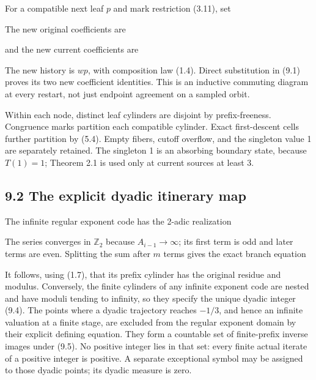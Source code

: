 For a compatible next leaf \(p\) and mark restriction (3.11), set


The new original coefficients are


and the new current coefficients are


The new history is \(wp\), with composition law (1.4). Direct
substitution in (9.1) proves its two new coefficient identities. This is
an inductive commuting diagram at every restart, not just endpoint
agreement on a sampled orbit.

Within each node, distinct leaf cylinders are disjoint by
prefix-freeness. Congruence marks partition each compatible cylinder.
Exact first-descent cells further partition by (5.4). Empty fibers,
cutoff overflow, and the singleton value 1 are separately retained. The
singleton 1 is an absorbing boundary state, because \(T(1)=1\); Theorem
2.1 is used only at current sources at least 3.

\subsection{9.2 The explicit dyadic itinerary map}

The infinite regular exponent code has the 2-adic realization


The series converges in \(\mathbb Z_2\) because \(A_{i-1}\to\infty\);
its first term is odd and later terms are even. Splitting the sum after
\(m\) terms gives the exact branch equation


It follows, using (1.7), that its prefix cylinder has the original
residue and modulus. Conversely, the finite cylinders of any infinite
exponent code are nested and have moduli tending to infinity, so they
specify the unique dyadic integer (9.4). The points where a dyadic
trajectory reaches \(-1/3\), and hence an infinite valuation at a finite
stage, are excluded from the regular exponent domain by their explicit
defining equation. They form a countable set of finite-prefix inverse
images under (9.5). No positive integer lies in that set: every finite
actual iterate of a positive integer is positive. A separate exceptional
symbol may be assigned to those dyadic points; its dyadic measure is
zero.

